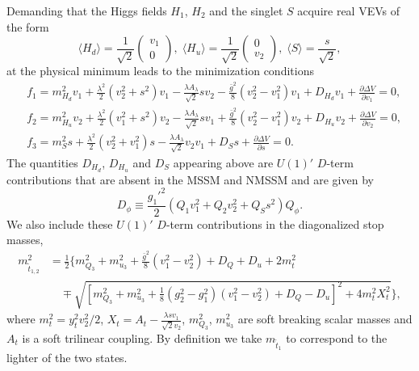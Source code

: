 \documentclass[preprint,amsmath,amssymb,aps,superscriptaddress,prd,
showpacs,floatfix,nofootinbib]{revtex4-1}
\begin{document}
Demanding that the Higgs fields $H_1$, $H_2$ and the singlet $S$ acquire real
VEVs of the form
\begin{equation} \label{eq:E6vevs}
\langle H_d \rangle = \frac{1}{\sqrt{2}} \begin{pmatrix} v_1 \\ 0
\end{pmatrix} , \;
\langle H_u \rangle = \frac{1}{\sqrt{2}} \begin{pmatrix} 0 \\ v_2
\end{pmatrix} , \;
\langle S \rangle =\frac{s}{\sqrt{2}} ,
\end{equation}
at the physical minimum leads to the minimization conditions
\begin{subequations} \label{eq:E6EWSBConditions}
\begin{align}
&f_1 = m_{H_d}^2 v_1 + \frac{\lambda^2}{2} (v_2^2 + s^2) v_1-
\frac{\lambda A_\lambda}{\sqrt{2}} s v_2 - \frac{\bar{g}^2}{8}
(v_2^2 - v_1^2) v_1 + D_{H_d} v_1 + \frac{\partial \Delta V}{\partial v_1} = 0 ,
\label{eq:E6EWSBcondition1} \\
&f_2 = m_{H_u}^2 v_2 + \frac{\lambda^2}{2} (v_1^2 + s^2) v_2 -
\frac{\lambda A_\lambda}{\sqrt{2}} s v_1 + \frac{\bar{g}^2}{8}
(v_2^2 - v_1^2) v_2 + D_{H_u} v_2 + \frac{\partial \Delta V}{\partial v_2} = 0 ,
\label{eq:E6EWSBcondition2} \\
&f_3 = m_S^2 s + \frac{\lambda^2}{2} (v_2^2 + v_1^2) s -
\frac{\lambda A_\lambda}{\sqrt{2}} v_2 v_1 + D_S s +
\frac{\partial \Delta V}{\partial s} = 0 . \label{eq:E6EWSBcondition3}
\end{align}
\end{subequations}
The quantities $D_{H_d}$, $D_{H_u}$ and $D_S$ appearing above are $U(1)'$
$D$-term contributions that are absent in the MSSM and NMSSM and are given by
\begin{equation} \label{eq:E6Dterms}
D_\phi \equiv \frac{g_1'^2}{2} \left (Q_1 v_1^2 + Q_2 v_2^2 + Q_S s^2
\right ) Q_\phi .
\end{equation}
We also include these $U(1)'$ $D$-term contributions in the diagonalized stop
masses,
\begin{align}
m_{\tilde{t}_{1,2}}^2 &= \frac{1}{2} \bigg \{ m_{Q_3}^2 + m_{u_3}^2 +
\frac{\bar{g}^2}{8} \left ( v_1^2 - v_2^2 \right ) + D_Q + D_u + 2 m_t^2
\nonumber \\
& \quad {} \mp \sqrt{\left [ m_{Q_3}^2 + m_{u_3}^2 + \frac{1}{8} \left (g_2^2
- g_1^2 \right ) \left (v_1^2 - v_2^2 \right ) + D_Q - D_u \right ]^2 +
4 m_t^2 X_t^2} \bigg \} ,
\end{align}
where $m_t^2 = y_t^2 v_2^2 / 2$, $X_t = A_t -
\frac{\lambda s v_1}{\sqrt{2} v_2}$, $m_{Q_3}^2$, $m_{u_3}^2$ are soft
breaking scalar masses and $A_t$ is a soft trilinear coupling.  By definition
we take $m_{\tilde{t}_1}$ to correspond to the lighter of the two states.
\end{document}
